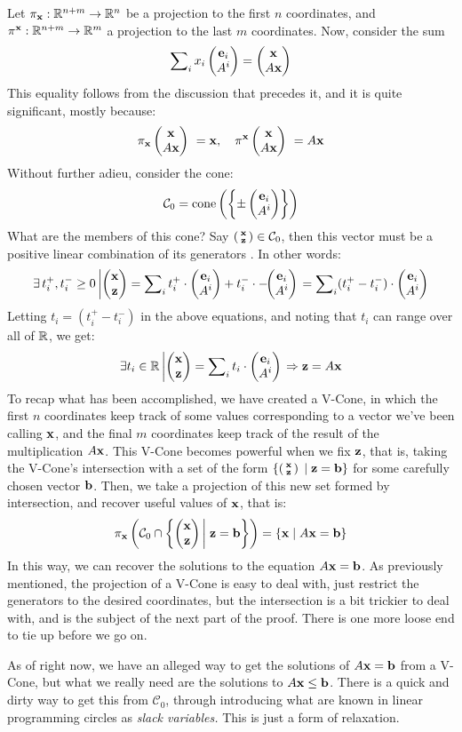 Let $\pi_{\mathbf{x}} : \mathbb{R}^{n+m} \to \mathbb{R}^{n}$ be a projection to the first $n$ coordinates, and $\pi^{\mathbf{x}} : \mathbb{R}^{n+m} \to \mathbb{R}^{m}$ a projection to the last $m$ coordinates.  Now, consider the sum 
  \[ \sum\nolimits_i x_i \begin{pmatrix}\mathbf{e}_i \\ A^i\end{pmatrix} = \begin{pmatrix}\mathbf{x} \\ A\mathbf{x}\end{pmatrix} \]
This equality follows from the discussion that precedes it, and it is quite significant, mostly because:
  \[ \pi_{\mathbf{x}} \begin{pmatrix}\mathbf{x} \\ A\mathbf{x}\end{pmatrix}\ = \mathbf{x},\quad \pi^{\mathbf{x}} \begin{pmatrix}\mathbf{x} \\ A\mathbf{x}\end{pmatrix}\ = A\mathbf{x} \]
Without further adieu, consider the cone:
  \[ \mathcal{C}_0 = \operatorname{cone}\left(\left\{\pm\begin{pmatrix}\mathbf{e}_i \\ A^i\end{pmatrix}\right\}\right) \]
What are the members of this cone?  Say $\left(\begin{smallmatrix}\mathbf{x} \\ \mathbf{z}\end{smallmatrix}\right) \in \mathcal{C}_0$, then this vector must be a positive linear combination of its generators .  In other words:
  \[ \exists\, t^+_i, t^-_i \geq 0 \left| \begin{pmatrix}\mathbf{x} \\ \mathbf{z}\end{pmatrix} = 
       \sum\nolimits_i t^+_i \cdot\begin{pmatrix}\mathbf{e}_i \\ A^i\end{pmatrix} + 
                       t^-_i \cdot{-\!\!\begin{pmatrix}\mathbf{e}_i \\ A^i\end{pmatrix}} \right. =
       \sum\nolimits_i (t^+_i - t^-_i) \cdot\begin{pmatrix}\mathbf{e}_i \\ A^i\end{pmatrix}
   \]
Letting $t_i = (t^+_i - t^-_i)$ in the above equations, and noting that $t_i$ can range over all of $\mathbb{R}$, we get:
  \[ \exists t_i \in \mathbb{R} \left| \begin{pmatrix}\mathbf{x} \\ \mathbf{z}\end{pmatrix} = \sum\nolimits_i t_i \cdot\begin{pmatrix}\mathbf{e}_i \\ A^i\end{pmatrix} \right.
       \Rightarrow \mathbf{z} = A\mathbf{x} \]
To recap what has been accomplished, we have created a V-Cone, in which the first $n$ coordinates keep track of some values corresponding to a vector we've been calling $\mathbf{x}$, and the final $m$ coordinates keep track of the result of the multiplication $A\mathbf{x}$.  This V-Cone becomes powerful when we fix $\mathbf{z}$, that is, taking the V-Cone's intersection with a set of the form $\{\left(\begin{smallmatrix}\mathbf{x} \\ \mathbf{z}\end{smallmatrix}\right) \;|\; \mathbf{z} = \mathbf{b}\}$ for some carefully chosen vector $\mathbf{b}$.  Then, we take a projection of this new set formed by intersection, and recover useful values of $\mathbf{x}$, that is:
  \[ \pi_{\mathbf{x}}\left(\mathcal{C}_0 \cap 
             \left\{\begin{pmatrix}\mathbf{x} \\ \mathbf{z}\end{pmatrix} \bigg|\; \mathbf{z} = \mathbf{b} \right\}\right) =
     \left\{\mathbf{x} \;|\; A\mathbf{x} = \mathbf{b}\right\} 
  \]
In this way, we can recover the solutions to the equation $A\mathbf{x} = \mathbf{b}$.  As previously mentioned, the projection of a V-Cone is easy to deal with, just restrict the generators to the desired coordinates, but the intersection is a bit trickier to deal with, and is the subject of the next part of the proof.  There is one more loose end to tie up before we go on.

As of right now, we have an alleged way to get the solutions of $A\mathbf{x} = \mathbf{b}$ from a V-Cone, but what we really need are the solutions to $A\mathbf{x} \leq \mathbf{b}$.  There is a quick and dirty way to get this from $\mathcal{C}_0$, through introducing what are known in linear programming circles as \textit{slack variables.}  This is just a form of relaxation.

